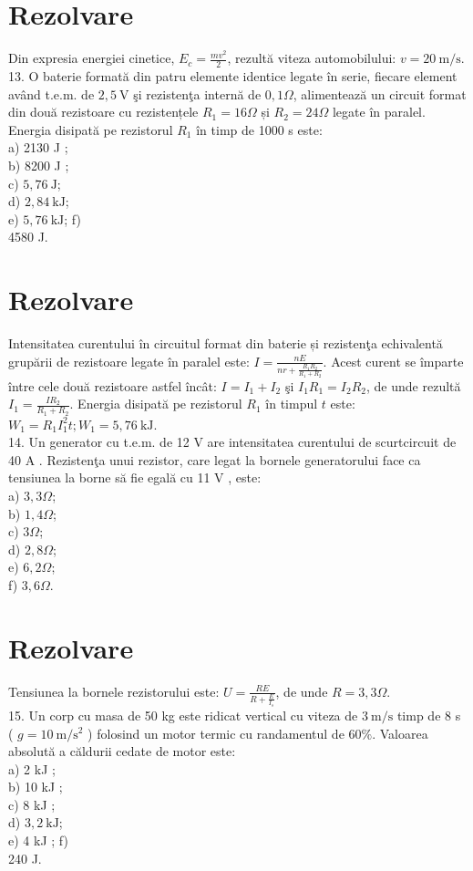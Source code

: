 \section*{Rezolvare}
Din expresia energiei cinetice, $E_{c}=\frac{m v^{2}}{2}$, rezultă viteza automobilului: $v=20 \mathrm{~m} / \mathrm{s}$.\\
13. O baterie formată din patru elemente identice legate în serie, fiecare element având t.e.m. de $2,5 \mathrm{~V}$ şi rezistenţa internă de $0,1 \Omega$, alimentează un circuit format din două rezistoare cu rezistențele $R_{1}=16 \Omega$ și $R_{2}=24 \Omega$ legate în paralel. Energia disipată pe rezistorul $R_{1}$ în timp de 1000 s este:\\
a) 2130 J ;\\
b) 8200 J ;\\
c) $5,76 \mathrm{~J}$;\\
d) $2,84 \mathrm{~kJ}$;\\
e) $5,76 \mathrm{~kJ}$; f)\\
4580 J.

\section*{Rezolvare}
Intensitatea curentului în circuitul format din baterie și rezistenţa echivalentă grupării de rezistoare legate în paralel este: $I=\frac{n E}{n r+\frac{R_{1} R_{2}}{R_{1}+R_{2}}}$. Acest curent se împarte între cele două rezistoare astfel încât: $I=I_{1}+I_{2}$ şi $I_{1} R_{1}=I_{2} R_{2}$, de unde rezultă $I_{1}=\frac{I R_{2}}{R_{1}+R_{2}}$. Energia disipată pe rezistorul $R_{1}$ în timpul $t$ este: $W_{1}=R_{1} I_{1}^{2} t ; W_{1}=5,76 \mathrm{~kJ}$.\\
14. Un generator cu t.e.m. de 12 V are intensitatea curentului de scurtcircuit de 40 A . Rezistenţa unui rezistor, care legat la bornele generatorului face ca tensiunea la borne să fie egală cu 11 V , este:\\
a) $3,3 \Omega$;\\
b) $1,4 \Omega$;\\
c) $3 \Omega$;\\
d) $2,8 \Omega$;\\
e) $6,2 \Omega$;\\
f) $3,6 \Omega$.

\section*{Rezolvare}
Tensiunea la bornele rezistorului este: $U=\frac{R E}{R+\frac{E}{I_{s}}}$, de unde $R=3,3 \Omega$.\\
15. Un corp cu masa de 50 kg este ridicat vertical cu viteza de $3 \mathrm{~m} / \mathrm{s}$ timp de 8 s ( $g=10 \mathrm{~m} / \mathrm{s}^{2}$ ) folosind un motor termic cu randamentul de $60 \%$. Valoarea absolută a căldurii cedate de motor este:\\
a) 2 kJ ;\\
b) 10 kJ ;\\
c) 8 kJ ;\\
d) $3,2 \mathrm{~kJ}$;\\
e) 4 kJ ; f)\\
240 J.


